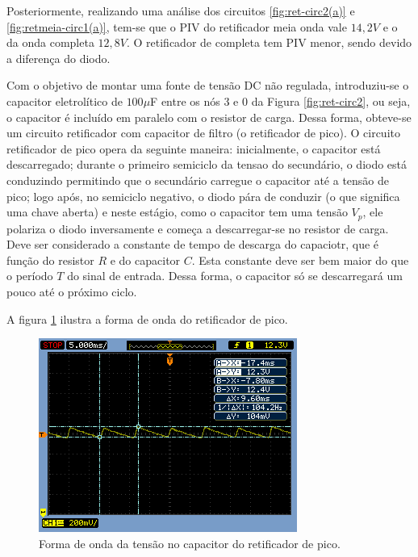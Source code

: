 \documentclass[a4paper]{article} %
\begin{document}
Posteriormente, realizando uma análise dos circuitos  \ref{fig:ret-circ2(a)} e \ref{fig:retmeia-circ1(a)}, tem-se que o PIV do retificador meia onda vale $14,2V$ e o da onda completa $12,8V$. O retificador de completa tem PIV menor, sendo devido a diferença do diodo.

\newpage
    Com o objetivo de montar uma fonte de tensão DC não regulada, introduziu-se o capacitor eletrolítico de  $100\mu$F entre os nós 3 e 0 da Figura \ref{fig:ret-circ2}, ou seja, o capacitor é incluído em paralelo com o resistor de carga. Dessa forma, obteve-se um circuito retificador com capacitor de filtro (o retificador de pico).
         O circuito retificador de pico opera da seguinte maneira: inicialmente, o capacitor está descarregado; durante o primeiro semiciclo da tensao do secundário, o diodo está conduzindo permitindo que o secundário carregue o capacitor até a tensão de pico; logo após, no semiciclo negativo, o diodo pára de conduzir (o que significa uma chave aberta) e neste estágio, como o capacitor tem uma tensão $V_p$, ele polariza o diodo inversamente e começa a descarregar-se no resistor de carga. Deve ser considerado a constante de tempo de descarga do capaciotr, que é função do resistor $R$ e do capacitor $C$. Esta constante deve ser bem maior do que o período $T$ do sinal de entrada. Dessa forma, o capacitor só se descarregará um pouco até o próximo ciclo.

A figura \ref{fig:cap-ret} ilustra a forma de onda do retificador de pico.

\begin{figure}[h!]
\begin{centering}
\includegraphics[scale=0.7]{Imagens/3.3.4capacitor_paralelo/3cap} \caption{Forma de onda da tensão no capacitor do retificador de pico. \label{fig:cap-ret}}
\par\end{centering}
\end{figure}
\end{document}
